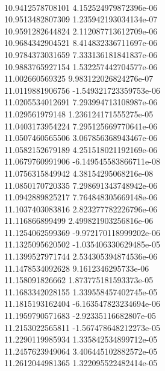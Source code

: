 { \\
10.9412578708101 4.152524979872396e-06
 \\
10.9513482807309 1.235942193034134e-07
 \\
10.9591282644824 2.112087713612709e-06
 \\
10.9684342904521 8.414832336711697e-06
 \\
10.9784373031659 7.333136181841837e-06
 \\
10.9883765927154 1.532257442704577e-06
 \\
11.002660569325 9.983122026824276e-07
 \\
11.0119881906756 -1.549321723359753e-06
 \\
11.0205534012691 7.293994713108987e-06
 \\
11.029561979148 1.236124171555275e-05
 \\
11.0403173954224 7.295125669770641e-06
 \\
11.0507460565506 3.067856368943467e-06
 \\
11.0582152679189 4.251518021192169e-06
 \\
11.0679760991906 -6.149545583866711e-08
 \\
11.0756315849942 4.38154295068216e-08
 \\
11.0850170720335 7.298691343748942e-06
 \\
11.0942889825217 7.764848305669148e-06
 \\
11.1037403083816 2.823277782226796e-06
 \\
11.116866899499 2.499821903256816e-06
 \\
11.1254062599369 -9.972170118999202e-06
 \\
11.1325095620502 -1.035406330629485e-05
 \\
11.1399527971744 2.534305394874536e-06
 \\
11.1478534092628 9.1612346295733e-06
 \\
11.158091826662 1.873775181593373e-05
 \\
11.1683342028155 1.339558457402745e-05
 \\
11.1815193162404 -6.163547823234694e-06
 \\
11.1959790571683 -2.92335116682807e-05
 \\
11.2153022565811 -1.567478648212273e-05
 \\
11.2290119985934 1.335842534899712e-05
 \\
11.2457623949064 3.406445102882572e-05
 \\
11.2612044981365 1.322095522482414e-05
 \\
}
